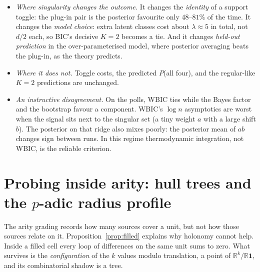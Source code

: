 \documentclass[11pt]{article}
\theoremstyle{definition}
\theoremstyle{remark}
\newcommand{\R}{\mathbb{R}}
\begin{document}
\begin{itemize}
  \item \emph{Where singularity changes the outcome.} It changes the \emph{identity} of a support toggle: the plug-in pair is the posterior favourite only $48$--$81\%$ of the time. It changes the \emph{model choice}: extra latent classes cost about $\lambda\approx5$ in total, not $d/2$ each, so BIC's decisive $K=2$ becomes a tie. And it changes \emph{held-out prediction} in the over-parameterised model, where posterior averaging beats the plug-in, as the theory predicts.
  \item \emph{Where it does not.} Toggle costs, the predicted $P$(all four), and the regular-like $K=2$ predictions are unchanged.
  \item \emph{An instructive disagreement.} On the polls, WBIC ties while the Bayes factor and the bootstrap favour a component. WBIC's $\log n$ asymptotics are worst when the signal sits next to the singular set (a tiny weight $a$ with a large shift $b$). The posterior on that ridge also mixes poorly: the posterior mean of $ab$ changes sign between runs. In this regime thermodynamic integration, not WBIC, is the reliable criterion.
\end{itemize}

\section{Probing inside arity: hull trees and the $p$-adic radius profile}\label{sec:hull}
The arity grading records how many sources cover a unit, but not how those sources relate on it. Proposition~\ref{prop:filled} explains why holonomy cannot help. Inside a filled cell every loop of differences on the same unit sums to zero. What survives is the \emph{configuration} of the $k$ values modulo translation, a point of $\R^k/\R\mathbf 1$, and its combinatorial shadow is a tree.
\end{document}
